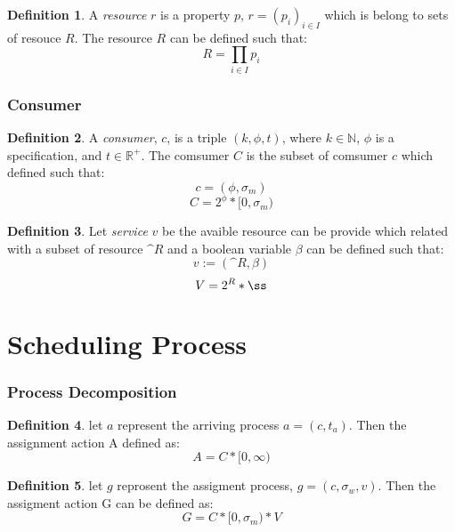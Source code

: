 \documentclass{article}
\theoremstyle{definition}
\newtheorem{definition}{Definition}[section]
\theoremstyle{remark}
\theoremstyle{theorem}
\theoremstyle{definition}
\begin{document}
	\begin{definition}
		A \emph{resource} $r$ is a property $p$, $r = (p_i )_{i\in I}$ which is belong to sets of resouce $R$. The resource $R$ can be defined such that:
		\[
		R = \prod_{i \in I}p_i
		\]
		
	\end{definition}
	
	\section{Consumer}
	
	\begin{definition}
		A \emph{consumer}, $c$, is a triple $(k, \phi, t)$, where $k \in \mathbb{N}$, $\phi$ is a specification, and $t \in \mathbb{R}^{+}$. The comsumer $C$ is the subset of comsumer $c$ which defined such that:
		\[
		c = (\phi , \sigma_m)
		\]
		\[
		C = 2^{\phi}*[0,\sigma_m)
		\]
		
	\end{definition}

	\begin{definition}
		Let \emph{service} $v$ be the avaible resource can be provide which related with a subset of resource $\^{R}$ and a boolean variable $\beta$ can be defined such that:
		\[
		v := (\^{R}, \beta)
		\]
		\[
		V = 2^{R}*{\ss}
		\]
	
	\end{definition}
	
	\part{Scheduling Process}
	
	\section{Process Decomposition}
	
	\begin{definition}
		let $a$ represent the arriving process $a = (c, t_a)$. Then the assignment action A defined as:
		\[
		A = C * [0, \infty)
		\]
	\end{definition}
	
	\begin{definition}
		let $g$ reprosent the assigment process, $g = (c,\sigma_w, v)$. Then the assigment action G can be defined as:
		\[
		G = C*[0,\sigma_m)*V
		\]
	
	\end{definition}
\end{document}
